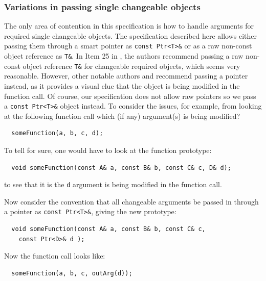 \documentclass[pdf,ps2pdf,11pt]{SANDreport}
\begin{document}
%
\subsubsection*{Variations in passing single changeable objects}
%

The only area of contention in this specification is how to handle
arguments for required single changeable objects.  The specification
described here allows either passing them through a smart pointer as
{}\texttt{const Ptr<T>\&} or as a raw non-const object reference as
{}\texttt{T\&}.  In Item 25 in {}\cite{C++CodingStandards05}, the
authors recommend passing a raw non-const object reference
{}\texttt{T\&} for changeable required objects, which seems very
reasonable.  However, other notable authors {}\cite[Section Section
5.5]{stroustrup97} and {}\cite[Section 13.2]{CodeComplete2nd04}
recommend passing a pointer instead, as it provides a visual clue that
the object is being modified in the function call.  Of course, our
specification does not allow raw pointers so we pass a {}\texttt{const
Ptr<T>\&} object instead.  To consider the issues, for example, from
looking at the following function call which (if any) argument(s) is
being modified?

{\small\begin{verbatim}
  someFunction(a, b, c, d);
\end{verbatim}}

To tell for sure, one would have to look at the function prototype:

{\small\begin{verbatim}
  void someFunction(const A& a, const B& b, const C& c, D& d);
\end{verbatim}}

to see that it is the {}\texttt{d} argument is being modified in the
function call.

Now consider the convention that all changeable arguments be passed in
through a pointer as {}\texttt{const Ptr<T>\&}, giving the new
prototype:

{\small\begin{verbatim}
  void someFunction(const A& a, const B& b, const C& c,
    const Ptr<D>& d );
\end{verbatim}}

Now the function call looks like:

{\small\begin{verbatim}
  someFunction(a, b, c, outArg(d));
\end{verbatim}}
\end{document}
